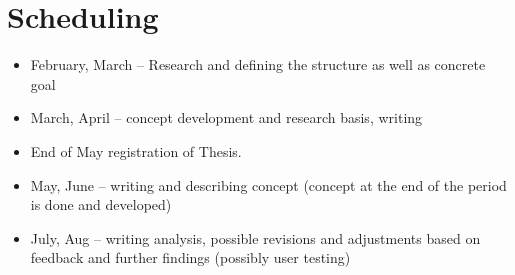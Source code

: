 \section{Scheduling}
\begin{itemize}
	\item February, March – Research and defining the structure as well as concrete goal
	\item March, April – concept development and research basis, writing
	\item End of May registration of Thesis.
	\item May, June – writing and describing concept (concept at the end of the period is done and developed)
	\item July, Aug – writing analysis, possible revisions and adjustments based on feedback and further findings (possibly user testing)
\end{itemize}

